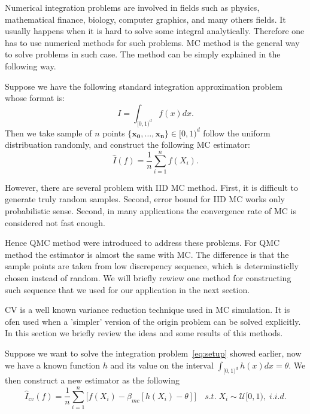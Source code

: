 
Numerical integration problems are involved in fields such as physics, mathematical finance, biology, computer graphics, and many others fields. 
It usually happens when it is hard to solve some integral analytically. Therefore one has to use numerical methods for such problems.  
MC method is the general way to solve problems in such case\cite{fishman2013monte}. The method can be simply explained in the following way. 

Suppose we have the following standard integration approximation problem whose format is: 
\begin{equation}
    \label{eq:setup}
    I= \int_{[0,1)^d}f(x)dx.
\end{equation}
Then we take sample of $n$ points $\{\mathbf{x_0},\dots, \mathbf{x_n}\}\in [0,1)^d$ follow the uniform distribuation randomly, and construct the following MC estimator:
\[
\hat{I}(f)=\frac{1}{n}\sum_{i=1}^{n}f(X_i).
\]

However, there are several problem with IID MC method\cite{niederreiter2010quasi}.
First, it is difficult to generate truly random samples. Second, error bound for IID MC works only probabilistic sense. 
Second, in many applications the convergence rate of MC is considered not fast enough. 

Hence QMC method were introduced to address these problems. 
For QMC method the estimator is almost the same with MC. 
The difference is that the sample points are taken from low discrepency sequence, which is determinsticlly chosen instead of random.   
We will briefly rewiew one method for constructing such sequence that we used for our application in the next section. 




CV is a well known variance reduction technique used in MC simulation. 
It is ofen used when a 'simpler' version of the origin problem can be solved explicitly. In this section we briefly review the ideas and some results of this methods.
 
Suppose we want to solve the integration problem~\eqref{eq:setup} showed earlier, now we have a known function $h$ and its value on the interval
$\int_{[0,1)^d} h(x)dx = \theta$.  We then construct a new estimator as the following 
\[ \hat{I}_{cv}(f)=\frac{1}{n}\sum_{i=1}^{n}\Big[ f(X_i)-\beta_{mc}[h(X_i)-\theta] \Big] \quad s.t.\; X_i\sim \mathcal{U}[0,1), \; i.i.d.\]

